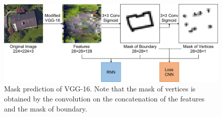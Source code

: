 \begin{figure}[!h]
	\centering
	\includegraphics[width=\fig\textwidth]{3-03.pdf}
    \caption[Mask prediction of VGG-16]{Mask prediction of VGG-16. Note that the mask of vertices is obtained by the convolution on the concatenation of the features and the mask of boundary.}
    \label{fig:vgg16mask}
\end{figure}